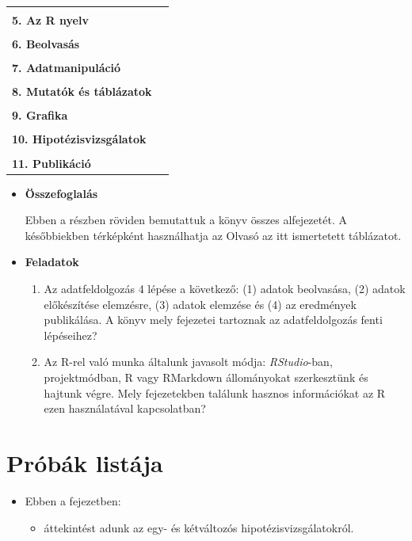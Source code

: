 \documentclass[
]{book}
\providecommand{\tightlist}{%
  \setlength{\itemsep}{0pt}\setlength{\parskip}{0pt}}
\newenvironment{rmdblock}[1]
  {\begin{shaded*}
  \begin{itemize}
  \renewcommand{\labelitemi}{
    \raisebox{-.7\height}[0pt][0pt]{
      {\setkeys{Gin}{width=3em,keepaspectratio}\texttt{[image: images/\#1]}}
    }
  }
  \item
  }
  {
  \end{itemize}
  \end{shaded*}
  }
\newenvironment{rmdlevel3}
  {\begin{rmdblock}{level3}}
  {\end{rmdblock}}
\newenvironment{rmdsummary}
  {\begin{rmdblock}{summary}}
  {\end{rmdblock}}
\newenvironment{rmdexercise}
  {\begin{rmdblock}{exercise}}
  {\end{rmdblock}}
\begin{document}
\begin{longtable}[]{@{}
  >{\raggedright\arraybackslash}p{}
  >{\raggedright\arraybackslash}p{}@{}}
& \\
\textbf{5. Az R nyelv} & \\
& \\
\textbf{6. Beolvasás} & \\
& \\
\textbf{7. Adatmanipuláció} & \\
& \\
\textbf{8. Mutatók és táblázatok} & \\
& \\
\textbf{9. Grafika} & \\
& \\
\textbf{10. Hipotézisvizsgálatok} & \\
& \\
\textbf{11. Publikáció} & \\
\bottomrule
\end{longtable}

\endgroup{}

\begin{rmdsummary}
\textbf{Összefoglalás}

Ebben a részben röviden bemutattuk a könyv összes alfejezetét. A
későbbiekben térképként használhatja az Olvasó az itt ismertetett
táblázatot.
\end{rmdsummary}

\begin{rmdexercise}
\textbf{Feladatok}

\begin{enumerate}
\def\labelenumi{\arabic{enumi}.}
\tightlist
\item
  Az adatfeldolgozás 4 lépése a következő: (1) adatok beolvasása, (2) adatok előkészítése elemzésre, (3) adatok elemzése és (4) az eredmények publikálása. A könyv mely fejezetei tartoznak az adatfeldolgozás fenti lépéseihez?
\item
  Az R-rel való munka általunk javasolt módja: \emph{RStudio}-ban, projektmódban, R vagy RMarkdown állományokat szerkesztünk és hajtunk végre. Mely fejezetekben találunk hasznos információkat az R ezen használatával kapcsolatban?
\end{enumerate}
\end{rmdexercise}

\hypertarget{pruxf3buxe1k-listuxe1ja}{%
\section{Próbák listája}\label{pruxf3buxe1k-listuxe1ja}}

\begin{rmdlevel3}
Ebben a fejezetben:

\begin{itemize}
\tightlist
\item
  áttekintést adunk az egy- és kétváltozós hipotézisvizsgálatokról.
\end{itemize}
\end{rmdlevel3}
\end{document}
